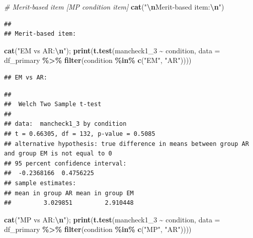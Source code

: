 \documentclass[
]{article}
\newenvironment{Shaded}{\begin{snugshade}}{\end{snugshade}}
\newcommand{\AttributeTok}[1]{\textcolor[rgb]{0.13,0.29,0.53}{#1}}
\newcommand{\CommentTok}[1]{\textcolor[rgb]{0.56,0.35,0.01}{\textit{#1}}}
\newcommand{\FunctionTok}[1]{\textcolor[rgb]{0.13,0.29,0.53}{\textbf{#1}}}
\newcommand{\NormalTok}[1]{#1}
\newcommand{\SpecialCharTok}[1]{\textcolor[rgb]{0.81,0.36,0.00}{\textbf{#1}}}
\newcommand{\StringTok}[1]{\textcolor[rgb]{0.31,0.60,0.02}{#1}}
\begin{document}
\begin{Shaded}
\begin{Highlighting}[]
\CommentTok{\# Merit{-}based item [MP condition item]}
\FunctionTok{cat}\NormalTok{(}\StringTok{"}\SpecialCharTok{\textbackslash{}n}\StringTok{Merit{-}based item:}\SpecialCharTok{\textbackslash{}n}\StringTok{"}\NormalTok{)}
\end{Highlighting}
\end{Shaded}

\begin{verbatim}
## 
## Merit-based item:
\end{verbatim}

\begin{Shaded}
\begin{Highlighting}[]
\FunctionTok{cat}\NormalTok{(}\StringTok{"EM vs AR:}\SpecialCharTok{\textbackslash{}n}\StringTok{"}\NormalTok{); }\FunctionTok{print}\NormalTok{(}\FunctionTok{t.test}\NormalTok{(mancheck1\_3 }\SpecialCharTok{\textasciitilde{}}\NormalTok{ condition, }
       \AttributeTok{data =}\NormalTok{ df\_primary }\SpecialCharTok{\%\textgreater{}\%} \FunctionTok{filter}\NormalTok{(condition }\SpecialCharTok{\%in\%} \FunctionTok{c}\NormalTok{(}\StringTok{"EM"}\NormalTok{, }\StringTok{"AR"}\NormalTok{))))}
\end{Highlighting}
\end{Shaded}

\begin{verbatim}
## EM vs AR:
\end{verbatim}

\begin{verbatim}
## 
##  Welch Two Sample t-test
## 
## data:  mancheck1_3 by condition
## t = 0.66305, df = 132, p-value = 0.5085
## alternative hypothesis: true difference in means between group AR and group EM is not equal to 0
## 95 percent confidence interval:
##  -0.2368166  0.4756225
## sample estimates:
## mean in group AR mean in group EM 
##         3.029851         2.910448
\end{verbatim}

\begin{Shaded}
\begin{Highlighting}[]
\FunctionTok{cat}\NormalTok{(}\StringTok{"MP vs AR:}\SpecialCharTok{\textbackslash{}n}\StringTok{"}\NormalTok{); }\FunctionTok{print}\NormalTok{(}\FunctionTok{t.test}\NormalTok{(mancheck1\_3 }\SpecialCharTok{\textasciitilde{}}\NormalTok{ condition, }
       \AttributeTok{data =}\NormalTok{ df\_primary }\SpecialCharTok{\%\textgreater{}\%} \FunctionTok{filter}\NormalTok{(condition }\SpecialCharTok{\%in\%} \FunctionTok{c}\NormalTok{(}\StringTok{"MP"}\NormalTok{, }\StringTok{"AR"}\NormalTok{))))}
\end{Highlighting}
\end{Shaded}
\end{document}
